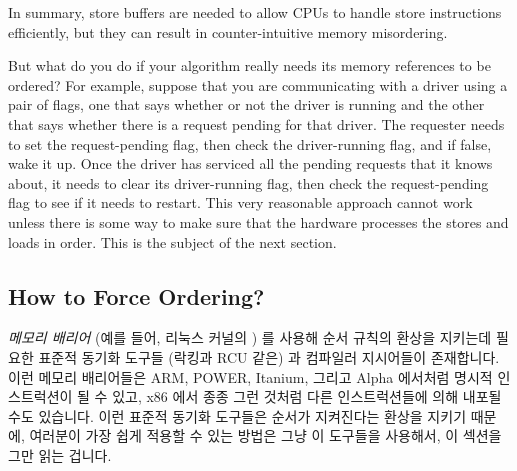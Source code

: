 In summary, store buffers are needed to allow CPUs to handle
store instructions efficiently, but they can result in
counter-intuitive memory misordering.

But what do you do if your algorithm really needs its memory
references to be ordered?
For example, suppose that you are communicating with a driver using
a pair of flags, one that says whether or not the driver is running
and the other that says whether there is a request pending for that
driver.
The requester needs to set the request-pending flag, then check
the driver-running flag, and if false, wake it up.
Once the driver has serviced all the pending requests that it knows about,
it needs to clear its driver-running flag, then check the request-pending
flag to see if it needs to restart.
This very reasonable approach cannot work unless there is some way
to make sure that the hardware processes the stores and loads in order.
This is the subject of the next section.
\fi

\subsection{How to Force Ordering?}
\label{sec:memorder:How to Force Ordering?}

\emph{메모리 배리어} (예를 들어, 리눅스 커널의 ) 를 사용해 순서
규칙의 환상을 지키는데 필요한 표준적 동기화 도구들 (락킹과 RCU 같은) 과
컴파일러 지시어들이 존재합니다.
이런 메모리 배리어들은 ARM, POWER, Itanium, 그리고 Alpha 에서처럼 명시적
인스트럭션이 될 수 있고, x86 에서 종종 그런 것처럼 다른 인스트럭션들에 의해
내포될 수도 있습니다.
이런 표준적 동기화 도구들은 순서가 지켜진다는 환상을 지키기 때문에, 여러분이
가장 쉽게 적용할 수 있는 방법은 그냥 이 도구들을 사용해서, 이 섹션을 그만 읽는
겁니다.

